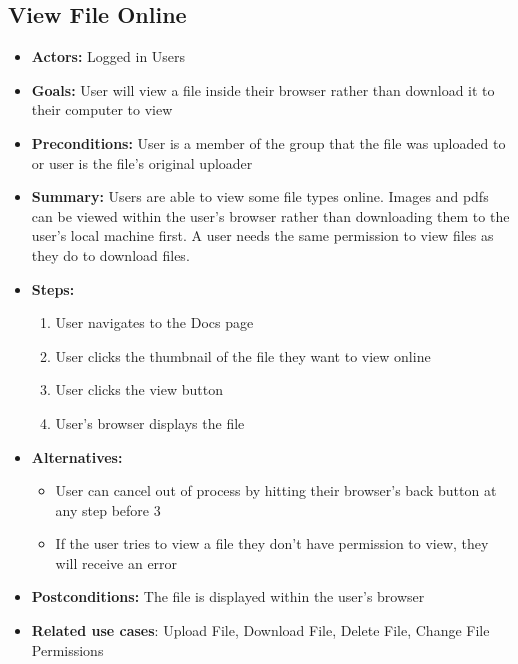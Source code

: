      \subsection{View File Online}
     \begin{itemize}
          \item{\textbf{Actors:} Logged in Users}
          \item{\textbf{Goals:} User will view a file inside their browser 
		   rather than download it to their computer to view}
          \item{\textbf{Preconditions:} User is a member of the 
                 group that the file was uploaded to or user is the 
		   file's original uploader}
          \item{\textbf{Summary:} Users are able to view some file types online. 
		   Images and pdfs can be viewed within the user's browser rather 
		   than downloading them to the user's local machine first. A user 
		   needs the same permission to view files as they do to download files.}
	  \item{\textbf{Steps:}}
	  \begin{enumerate}
	       \item{User navigates to the Docs page}
	       \item{User clicks the thumbnail of the file they want to view online}
	       \item{User clicks the view button}
	       \item{User's browser displays the file}
	  \end{enumerate}
	  \item{\textbf{Alternatives:}}
	  \begin{itemize}
	       \item{User can cancel out of process by hitting their 
		     browser's back button at any step before 3}
	       \item{If the user tries to view a file they don't have
		      permission to view, they will receive an error}
	  \end{itemize}
	  \item{\textbf{Postconditions:} The file is displayed within the user's browser}
	  \item{\textbf{Related use cases}: Upload File, Download File, 
		  Delete File, Change File Permissions}
     \end{itemize}

